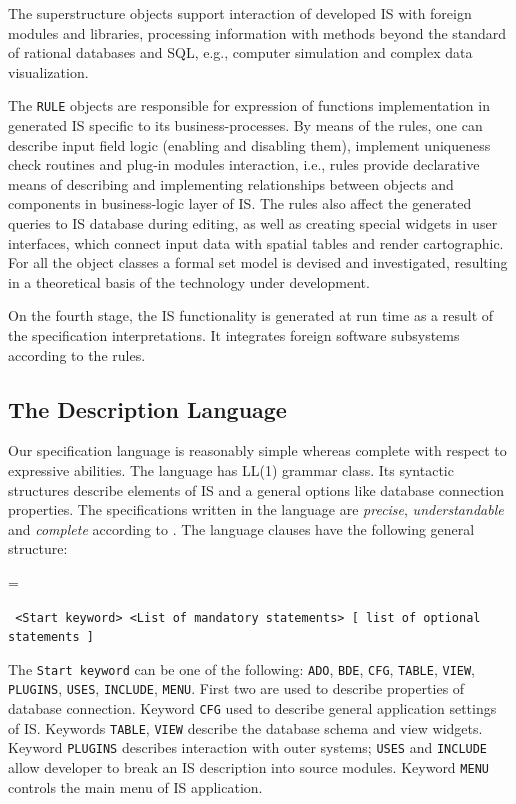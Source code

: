 \documentclass[conference]{IEEEtran}
\newcommand{\e}[2][fcolor]{\textcolor{pcolor}{[}\textcolor{#1}{#2}\textcolor{pcolor}{]}}
\newenvironment{asdcode}{\hangindent=\parindent\hangafter=1\par\noindent\small\tt}{}
\begin{document}
The superstructure objects support interaction of developed IS with foreign modules and libraries, processing information with methods beyond the standard of rational databases and SQL, e.g., computer simulation and complex data visualization.

The \texttt{RULE} objects are responsible for expression of functions implementation in generated IS specific to its business-processes.  By means of the rules, one can describe input field logic (enabling and disabling them), implement uniqueness check routines and plug-in modules interaction, i.e., rules provide declarative means of describing and implementing relationships between objects and components in business-logic layer of IS.  The rules also affect the generated queries to IS database during editing, as well as creating special widgets in user interfaces, which connect input data with spatial tables and render cartographic. For all the object classes a formal set model is devised and investigated, resulting in a theoretical basis of the technology under development.  %

On the fourth stage, the IS functionality is generated at run time as a result of the specification interpretations.  It integrates foreign software subsystems according to the rules. %

\subsection{The Description Language}

Our specification language is reasonably simple whereas complete with respect to expressive abilities.  The language has LL(1) grammar class.  Its syntactic structures describe elements of IS and a general options like database connection properties.  The specifications written in the language are \emph{precise}, \emph{understandable} and \emph{complete} according to \cite{aga1,aga2}.  The language clauses have the following general structure:

\begin{asdcode}%
<Start keyword> <List of mandatory statements> [~list of optional statements~]
\end{asdcode}

The \texttt{Start keyword} can be one of the following: \texttt{ADO}, \texttt{BDE}, \texttt{CFG}, \texttt{TABLE}, \texttt{VIEW}, \texttt{PLUGINS}, \texttt{USES}, \texttt{INCLUDE}, \texttt{MENU}.  First two are used to describe properties of database connection.  Keyword \texttt{CFG} used to describe general application settings of IS.  Keywords \texttt{TABLE}, \texttt{VIEW} describe the database schema and view widgets.  Keyword \texttt{PLUGINS} describes interaction with outer systems; \texttt{USES} and \texttt{INCLUDE} allow developer to break an IS description into source modules.  Keyword \texttt{MENU} controls the main menu of IS application.
\end{document}
